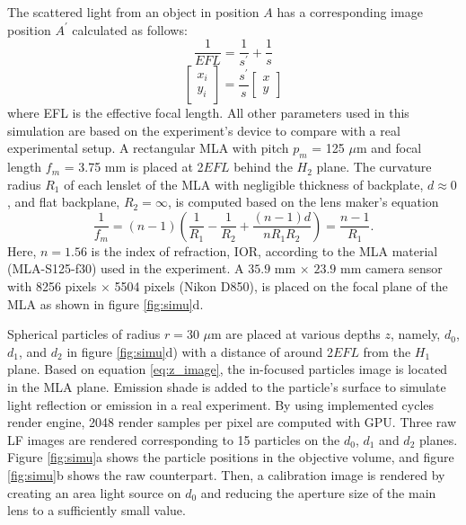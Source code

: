 \documentclass[draftthesis,fullpage]{uiucthesis}
\begin{document}
The scattered light from an object in position $A$ has a corresponding image position $A^{\prime}$ calculated as follows:
\begin{equation}
  \frac{1}{EFL} = \frac{1}{s^{\prime}} + \frac{1}{s}
\label{eq:z_image}
\end{equation}
\begin{equation}
  \left[\begin{array}{c}
    {x_i} \\
    {y_i}
    \end{array}\right]=\frac{s^{\prime}}{s}\left[\begin{array}{c}
    x \\
    y
    \end{array}\right] 
  \label{eq:xy_image}
\end{equation}
where EFL is the effective focal length. All other parameters used in this simulation are based on the experiment's device to compare with a real experimental setup. A rectangular MLA with pitch $p_m$ = 125 $\mu$m and focal length $f_m$ = 3.75 mm is placed at 2$EFL$ behind the $H_2$ plane. The curvature radius $R_1$ of each lenslet of the MLA with negligible thickness of backplate, $d \approx 0$, and flat backplane, $R_2 = \infty$, is computed based on the lens maker's equation
\begin{equation}
  \frac{1}{f_m}=(n-1)\left(\frac{1}{R_{1}}-\frac{1}{R_{2}}+\frac{(n-1) d}{n R_{1} R_{2}}\right)=\frac{n-1}{R_{1}}.
\label{eq:lensmaker}
\end{equation}
Here, $n = 1.56$ is the index of refraction, IOR, according to the MLA material (MLA-S125-f30) used in the experiment. A $35.9$ mm $\times$ $23.9$ mm camera sensor with 8256 pixels $\times$ 5504 pixels (Nikon D850), is placed on the focal plane of the MLA as shown in figure \ref{fig:simu}d.

Spherical particles of radius $r=30$ $\mu$m are placed at various depths $z$, namely, $d_0$, $d_1$,  and $d_2$ in figure \ref{fig:simu}d) with a distance of around 2$EFL$ from the $H_1$ plane. Based on equation \ref{eq:z_image}, the in-focused particles image is located in the MLA plane. Emission shade is added to the particle's surface to simulate light reflection or emission in a real experiment. By using implemented cycles render engine, 2048 render samples per pixel are computed with GPU. Three raw LF images are rendered corresponding to 15 particles on the $d_0$, $d_1$ and $d_2$ planes. Figure \ref{fig:simu}a shows the particle positions in the objective volume, and figure \ref{fig:simu}b shows the raw counterpart. Then, a calibration image is rendered by creating an area light source on $d_0$ and reducing the aperture size of the main lens to a sufficiently small value. 
\end{document}
